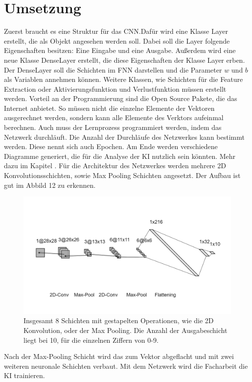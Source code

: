 \documentclass[11pt]{article}
\begin{document}
\section{Umsetzung}
Zuerst braucht es eine Struktur für das CNN.\@ Dafür wird eine Klasse Layer erstellt, die als Objekt angesehen werden soll. Dabei soll die Layer folgende
Eigenschaften besitzen: Eine Eingabe und eine Ausgabe. Außerdem wird eine neue Klasse DenseLayer erstellt, die diese Eigenschaften der Klasse Layer erben.
Der DenseLayer soll die Schichten im FNN darstellen und die Parameter $w$ und $b$ als Variablen annehmen können. Weitere Klassen, wie Schichten für die
Feature Extraction oder Aktivierungsfunktion und Verlustfunktion müssen erstellt werden. Vorteil an der Programmierung sind die Open Source Pakete, die das
Internet anbietet. So müssen nicht die einzelne Elemente der Vektoren ausgerechnet werden, sondern kann alle Elemente des Verktors aufeinmal berechnen.
Auch muss der Lernprozess programmiert werden, indem das Netzwerk durchläuft. Die Anzahl der Durchläufe des Netzwerkes kann bestimmt werden.
Diese nennt sich auch Epochen. Am Ende werden verschiedene Diagramme generiert, die für die Analyse der KI nutzlich sein könnten.
Mehr dazu im Kapitel . Für die Architektur des Netzwerkes werden mehrere 2D Konvolutionsschichten, sowie Max Pooling Schichten angesetzt.
Der Aufbau ist gut im Abbild 12 zu erkennen.
\begin{figure}[h]
    \centering
    \includegraphics[width=400pt, keepaspectratio]{images/cnn}
    \caption[Architektur eines CNNs]{Insgesamt 8 Schichten mit gestapelten Operationen, wie die 2D Konvolution, oder der Max Pooling.
    Die Anzahl der Ausgabeschicht liegt bei 10, für die einzelnen Ziffern von 0-9.}
\end{figure}
Nach der Max-Pooling Schicht wird das zum Vektor abgeflacht und mit zwei weiteren neuronale Schichten verbaut.
Mit dem Netzwerk wird die Facharbeit die KI trainieren.
\end{document}
